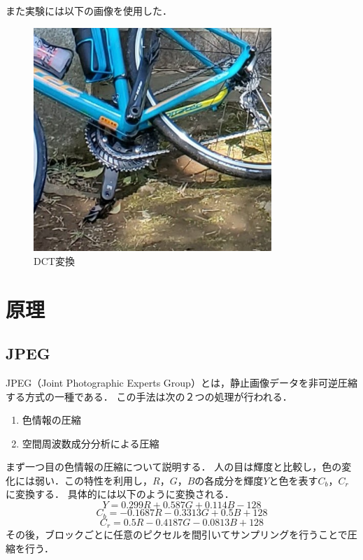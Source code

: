 \documentclass[a4paper,11pt]{bxjsarticle}
\begin{document}
  また実験には以下の画像を使用した．
  \begin{figure}[htbp]
    \centering  %
    \includegraphics[clip,width = 9.0cm]{sample_cut.eps}
    \caption{DCT変換}
    \label{fig:sample}
    \end{figure}

\section{原理}
\subsection{JPEG}
JPEG（Joint Photographic Experts Group）とは，静止画像データを非可逆圧縮する方式の一種である．
この手法は次の２つの処理が行われる．
\begin{enumerate}
  \item 色情報の圧縮
  \item 空間周波数成分分析による圧縮
\end{enumerate}

まず一つ目の色情報の圧縮について説明する．
人の目は輝度と比較し，色の変化には弱い．この特性を利用し，$R$，$G$，$B$の各成分を輝度$Y$と色を表す$C_b$，$C_r$に変換する．
具体的には以下のように変換される．\cite{jpeg2}
\begin{equation}
  Y = 0.299R + 0.587G + 0.114B - 128
\end{equation}
\begin{equation}
  C_b = - 0.1687R - 0.3313G + 0.5B + 128
\end{equation}
\begin{equation}
  C_r = 0.5R - 0.4187G - 0.0813B + 128
\end{equation}
その後，ブロックごとに任意のピクセルを間引いてサンプリングを行うことで圧縮を行う．
\end{document}
